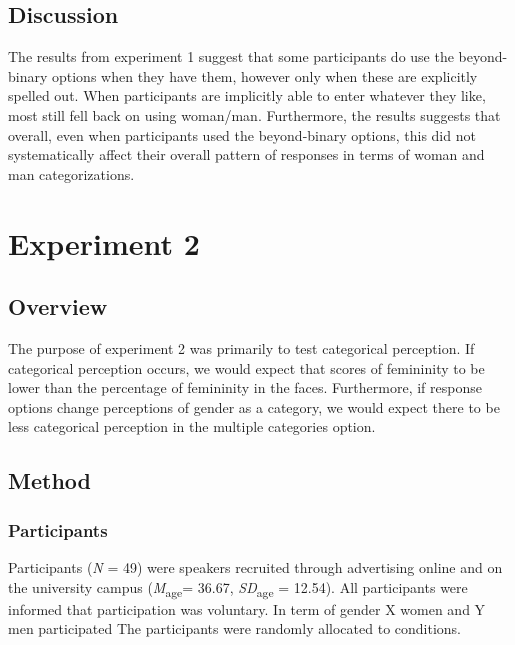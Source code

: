\documentclass[
  man]{apa7}
\begin{document}
\hypertarget{discussion}{%
\subsection{Discussion}\label{discussion}}

The results from experiment 1 suggest that some participants do use the beyond-binary options when they have them, however only when these are explicitly spelled out. When participants are implicitly able to enter whatever they like, most still fell back on using woman/man. Furthermore, the results suggests that overall, even when participants used the beyond-binary options, this did not systematically affect their overall pattern of responses in terms of woman and man categorizations.

\hypertarget{experiment-2}{%
\section{Experiment 2}\label{experiment-2}}

\hypertarget{overview}{%
\subsection{Overview}\label{overview}}

The purpose of experiment 2 was primarily to test categorical perception. If categorical perception occurs, we would expect that scores of femininity to be lower than the percentage of femininity in the faces. Furthermore, if response options change perceptions of gender as a category, we would expect there to be less categorical perception in the multiple categories option.

\hypertarget{method-1}{%
\subsection{Method}\label{method-1}}

\hypertarget{participants-1}{%
\subsubsection{Participants}\label{participants-1}}

Participants (\emph{N} = 49) were speakers recruited through advertising online and on the university campus (\emph{M}\textsubscript{age}= 36.67, \emph{SD}\textsubscript{age} = 12.54). All participants were informed that participation was voluntary. In term of gender X women and Y men participated The participants were randomly allocated to conditions.
\end{document}
